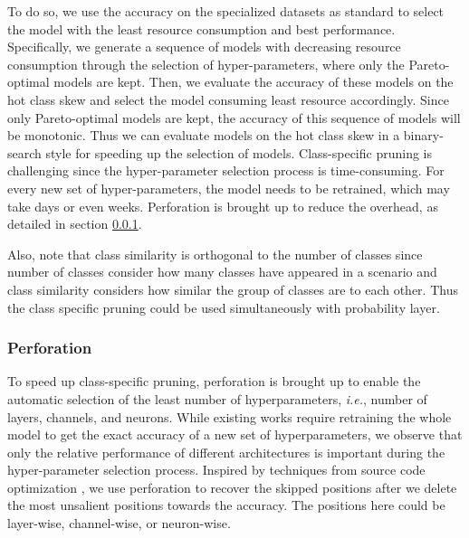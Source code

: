 \documentclass[pageno]{jpaper}
\begin{document}
To do so, we use the accuracy on the specialized datasets as standard to select the model with the least resource consumption and best performance. Specifically, we generate a sequence of models with decreasing resource consumption through the selection of hyper-parameters, where only the Pareto-optimal models are kept. Then, we evaluate the accuracy of these models on the hot class skew and select the model consuming least resource accordingly. Since only Pareto-optimal models are kept, the accuracy of this sequence of models will be monotonic. Thus we can evaluate models on the hot class skew in a binary-search style for speeding up the selection of models. Class-specific pruning is challenging since the hyper-parameter selection process is time-consuming. For every new set of hyper-parameters, the model needs to be retrained, which may take days or even weeks. Perforation is brought up to reduce the overhead, as detailed in section \ref{perforation}.

Also, note that class similarity is orthogonal to the number of classes since number of classes consider how many classes have appeared in a scenario and class similarity considers how similar the group of classes are to each other. Thus the class specific pruning could be used simultaneously with probability layer.\newline



\subsubsection{Perforation} \label{perforation}
To speed up class-specific pruning, perforation is brought up to enable the automatic selection of the least number of hyperparameters, \textit{i.e.}, number of layers, channels, and neurons. While existing works require retraining the whole model to get the exact accuracy of a new set of hyperparameters, we observe that only the relative performance of different architectures is important during the hyper-parameter selection process. Inspired by techniques from source code optimization \cite{figurnov2016perforatedcnns}, we use perforation to recover the skipped positions after we delete the most unsalient positions towards the accuracy. The positions here could be layer-wise, channel-wise, or neuron-wise. 
\end{document}
